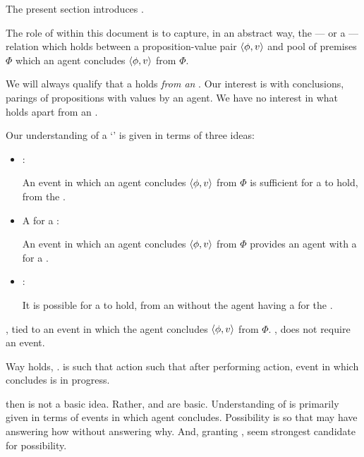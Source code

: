 \begin{note}
  The present section introduces \ros{}.

  The role of  within this document is to capture, in an abstract way, the --- or a --- relation which holds between a proposition-value pair \(\langle \phi, v \rangle\) and pool of premises \(\Phi\) which an agent concludes \(\langle \phi, v \rangle\) from \(\Phi\).
\end{note}

\begin{note}
  We will always qualify that a \ros{} holds \emph{from an \agpe{}}.
  Our interest is with conclusions, parings of propositions with values by an agent.
  We have no interest in what holds apart from an \agpe{}.
\end{note}

\begin{note}
  Our understanding of a `' is given in terms of three ideas:

  \begin{itemize}
  \item
    \supportI{}:

    An event in which an agent concludes \(\langle \phi, v \rangle\) from \(\Phi\) is sufficient for a \ros{} to hold, from the \agpe{}.
  \item
    A \wit{} for a \ros{}:

    An event in which an agent concludes \(\langle \phi, v \rangle\) from \(\Phi\) provides an agent with a  for a \ros{}.
  \item
    \supportII{}:

    It is possible for a \ros{} to hold, from an \agpe{} without the agent having a \wit{} for the \ros{}.
  \end{itemize}

  \supportI{}, tied to an event in which the agent concludes \(\langle \phi, v \rangle\) from \(\Phi\).
  \supportII{}, does not require an event.

  Way holds, .
  \fc{} is such that action such that after performing action, event in which concludes is in progress.

  \fc{} then \ros{} is not a basic idea.
  Rather, \supportI{} and \supportII{} are basic.
  Understanding of \ros{} is primarily given in terms of events in which agent concludes.
  Possibility is so that may have \ros{} answering how without answering why.
  And, granting \supportII{},  seem strongest candidate for possibility.
\end{note}

